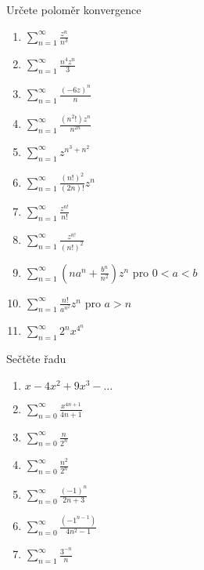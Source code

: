 \begin{multicols}{2}
Určete poloměr konvergence
\begin{enumerate}
\item $\sum_{n=1}^\infty \frac{z^n}{n^3}$
\item $\sum_{n=1}^\infty \frac{n^4 z^n}{3}$
\item $\sum_{n=1}^\infty \frac{(-6z)^n}{n}$
\item $\sum_{n=1}^\infty \frac{(n^2!)z^n}{n^{2n}}$
\item $\sum_{n=1}^\infty z^{n^3 + n^2}$
\item $\sum_{n=1}^\infty \frac{(n!)^2}{(2n)!} z^n$
\item $\sum_{n=1}^\infty \frac{z^{n!}}{n!}$
\item $\sum_{n=1}^\infty \frac{z^{n!}}{(n!)^2}$
\item $\sum_{n=1}^\infty \left( na^n + \frac{b^n}{n^2} \right) z^n$ pro $0 < a < b$
\item $\sum_{n=1}^\infty \frac{n!}{a^{n^2}} z^n$ pro $a > n$
\item $\sum_{n=1}^\infty 2^n x^{4^n}$
\end{enumerate}

\separator

Sečtěte řadu
\begin{enumerate}
\item $x - 4x^2 + 9x^3 - \ldots$
\item $\sum_{n=0}^\infty \frac{x^{4n+1}}{4n+1}$
\item $\sum_{n=0}^\infty \frac{n}{2^n}$
\item $\sum_{n=0}^\infty \frac{n^2}{2^n}$
\item $\sum_{n=0}^\infty \frac{(-1)^n}{2n+3}$
\item $\sum_{n=0}^\infty \frac{(-1^{n-1})}{4n^2 - 1}$
\item $\sum_{n=1}^{\infty} \frac{3^{-n}}{n}$
\end{enumerate}

\separator


\end{multicols}
